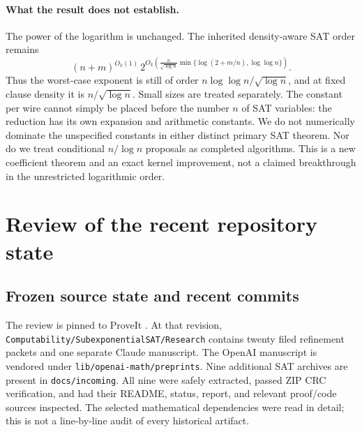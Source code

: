 \paragraph{What the result does not establish.}
The power of the logarithm is unchanged. The inherited density-aware SAT
order remains
\begin{equation}
 (n+m)^{O_k(1)}\,
 2^{O_k\left(\frac{n}{\sqrt{\log n}}
        \min\{\log(2+m/n),\log\log n\}\right)}.\label{eq:sat-envelope}
\end{equation}
Thus the worst-case exponent is still of order
$n\log\log n/\sqrt{\log n}$, and at fixed clause density it is
$n/\sqrt{\log n}$. Small sizes are treated separately. The constant per
wire cannot simply be placed before the number $n$ of SAT variables:
the reduction has its own expansion and arithmetic constants.
We do not numerically dominate the unspecified constants in either distinct
primary SAT theorem. Nor do we treat conditional $n/\log n$ proposals as
completed algorithms. This is a new coefficient theorem and an exact kernel
improvement, not a claimed breakthrough in the unrestricted logarithmic order.

\section{Review of the recent repository state}
\label{sec:corpus}

\subsection{Frozen source state and recent commits}
The review is pinned to ProveIt \pin. At that revision,
\texttt{Computability/SubexponentialSAT/Research} contains twenty filed
refinement packets and one separate Claude manuscript. The OpenAI manuscript
is vendored under \texttt{lib/openai-math/preprints}. Nine additional SAT
archives are present in \texttt{docs/incoming}. All nine were safely extracted,
passed ZIP CRC verification, and had their README, status, report, and relevant
proof/code sources inspected. The selected mathematical dependencies were
read in detail; this is not a line-by-line audit of every historical artifact.

